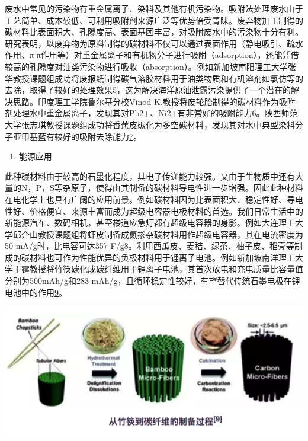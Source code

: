 \documentclass[]{book}
\providecommand{\tightlist}{%
  \setlength{\itemsep}{0pt}\setlength{\parskip}{0pt}}
\begin{document}
废水中常见的污染物有重金属离子、染料及其他有机污染物。吸附法处理废水由于工艺简单、成本较低、可利用吸附剂来源广泛等优势倍受青睐。废弃物加工制得的碳材料比表面积大、孔隙度高、表面基团丰富，对吸附废水中的污染物十分有利。研究表明，以废弃物为原料制得的碳材料不仅可以通过表面作用（静电吸引、疏水作用、π-π作用等）对重金属离子和有机物分子进行吸附（adsorption），还能凭借较高的孔隙度对油类污染物进行吸收（absorption）。例如新加坡南阳理工大学张华教授课题组成功将废报纸制得碳气溶胶材料用于油类物质和有机溶剂如氯仿等的去除，取得了较好的处理效果\href{Bi\%20H,\%20Huang\%20X,\%20et\%20al.\%20Small\%202014,\%2010,\%203544.}{5}，这为解决海洋原油泄露污染提供了一个潜在的解决思路。印度理工学院鲁尔基分校Vinod K.教授将废轮胎制得的碳材料作为吸附剂处理水中重金属离子，发现其对Pb2+、Ni2+有非常好的吸附能力\href{Gupta\%20V\%20K,\%20Ganjali\%20M\%20R,\%20et\%20al.\%20Chemical\%20Engineering\%20Journal,\%202012,\%20197:\%20330.}{6}。陕西师范大学张志琪教授课题组成功将香蕉皮碳化为多空碳材料，发现其对水中典型染料分子亚甲基蓝有较好的吸附去除能力\href{Liu\%20R\%20L,\%20Liu\%20Y,\%20et\%20al.\%20Bioresourse\%20Technology\%202014,\%20154:\%20138.}{7}。

\begin{enumerate}
\def\labelenumi{\arabic{enumi}.}
\setcounter{enumi}{2}
\tightlist
\item
  能源应用
\end{enumerate}

此种碳材料由于较高的石墨化程度，其电子传递能力较强。又由于生物质中还有大量的N，P，S等杂原子，使得由其制备的碳材料导电性进一步增强。因此此种材料在电化学上也具有广阔的应用前景。例如碳材料因为比表面积大、稳定性好、导电性好、价格便宜、来源丰富而成为超级电容器电极材料的首选。我们日常生活中的新能源汽车、数码相机，甚至楼道应急灯都有超级电容器的身影。例如大连理工大学邱介山教授课题组将虾皮制备成氮掺杂碳材料用作超级电容器，其在电流密度为50 mA/g时，比电容可达357 F/g\href{Gao\%20F,Qu\%20J\%20Y,\%20et\%20al.\%20Electrochim.\%20Acta\%202016,\%20190:\%201134.}{8}。利用西瓜皮、麦秸、绿茶、柚子皮、稻壳等制成的碳材料也可作为性能优异的负极材料用于锂离子电池。例如新加坡南洋理工大学于霆教授将竹筷碳化成碳纤维用于锂离子电池，其首次放电和充电质量比容量值分别为500mAh/g和283 mAh/g，且循环稳定性较好，有望替代传统石墨电极在锂电池中的作用\href{Jiang\%20J,\%20Zhu\%20J\%20H,\%20et\%20al.\%20Energy\%20Environ.\%20Sci.\%202014,\%207:\%202670.}{9}。

\includegraphics[width=8.33in]{images/nano3}
\end{document}

